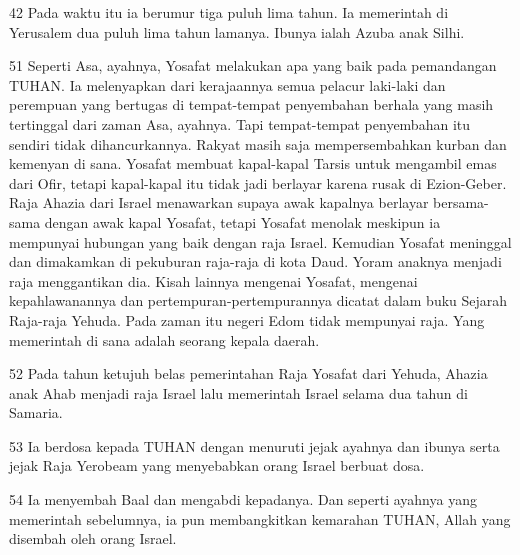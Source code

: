 \par 42 Pada waktu itu ia berumur tiga puluh lima tahun. Ia memerintah di Yerusalem dua puluh lima tahun lamanya. Ibunya ialah Azuba anak Silhi.
\par 51 Seperti Asa, ayahnya, Yosafat melakukan apa yang baik pada pemandangan TUHAN. Ia melenyapkan dari kerajaannya semua pelacur laki-laki dan perempuan yang bertugas di tempat-tempat penyembahan berhala yang masih tertinggal dari zaman Asa, ayahnya. Tapi tempat-tempat penyembahan itu sendiri tidak dihancurkannya. Rakyat masih saja mempersembahkan kurban dan kemenyan di sana. Yosafat membuat kapal-kapal Tarsis untuk mengambil emas dari Ofir, tetapi kapal-kapal itu tidak jadi berlayar karena rusak di Ezion-Geber. Raja Ahazia dari Israel menawarkan supaya awak kapalnya berlayar bersama-sama dengan awak kapal Yosafat, tetapi Yosafat menolak meskipun ia mempunyai hubungan yang baik dengan raja Israel. Kemudian Yosafat meninggal dan dimakamkan di pekuburan raja-raja di kota Daud. Yoram anaknya menjadi raja menggantikan dia. Kisah lainnya mengenai Yosafat, mengenai kepahlawanannya dan pertempuran-pertempurannya dicatat dalam buku Sejarah Raja-raja Yehuda. Pada zaman itu negeri Edom tidak mempunyai raja. Yang memerintah di sana adalah seorang kepala daerah.
\par 52 Pada tahun ketujuh belas pemerintahan Raja Yosafat dari Yehuda, Ahazia anak Ahab menjadi raja Israel lalu memerintah Israel selama dua tahun di Samaria.
\par 53 Ia berdosa kepada TUHAN dengan menuruti jejak ayahnya dan ibunya serta jejak Raja Yerobeam yang menyebabkan orang Israel berbuat dosa.
\par 54 Ia menyembah Baal dan mengabdi kepadanya. Dan seperti ayahnya yang memerintah sebelumnya, ia pun membangkitkan kemarahan TUHAN, Allah yang disembah oleh orang Israel.


